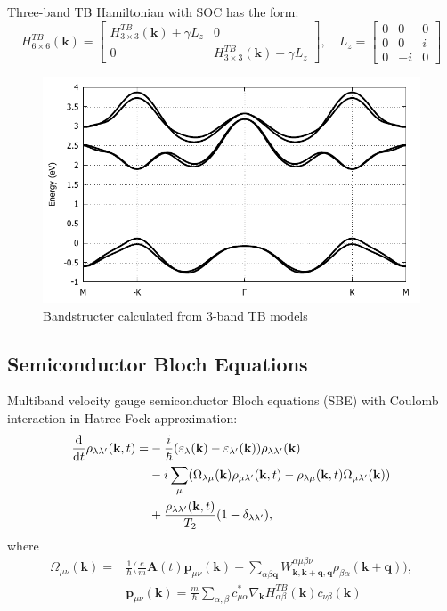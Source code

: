 \documentclass{beamer}
\begin{document}
	\begin{frame}
		Three-band TB Hamiltonian with SOC has the form:
		\begin{equation}
			H^{TB}_{6\times 6}(\textbf{k}) = \begin{bmatrix}
				H^{TB}_{3\times 3}(\textbf{k}) + \gamma L_z & 0\\ 0& H^{TB}_{3\times 3}(\textbf{k}) - \gamma L_z
			\end{bmatrix}, \quad L_z= \begin{bmatrix}
			0 & 0 & 0\\
			0 & 0 & i\\
			0 & -i& 0
			\end{bmatrix}
		\end{equation}
		\begin{figure}			
			\includegraphics[width=0.5\linewidth]{images/BS.pdf}
			\caption{Bandstructer calculated from 3-band TB models\cite{liu_three-band_2013}}
		\end{figure}
	\end{frame}
	\subsection{Semiconductor Bloch Equations}
	Multiband velocity gauge semiconductor Bloch equations (SBE) with Coulomb interaction in Hatree Fock approximation:
	\begin{align}
		\dv{ }{t}\rho_{\lambda \lambda'} (\textbf{k},t) = &-\frac{i}{\hbar} (\varepsilon_{\lambda}(\textbf{k}) -\varepsilon_{\lambda'}(\textbf{k}))\rho_{\lambda \lambda'} (\textbf{k})\nonumber\\
		& -i \sum_{\mu} (\Omega_{\lambda \mu}(\textbf{k})\rho_{\mu \lambda'}(\textbf{k},t) -\rho_{\lambda \mu}(\textbf{k},t)\Omega_{\mu \lambda'}(\textbf{k}))\\
		& + \frac{\rho_{\lambda \lambda'}(\textbf{k},t)}{T_2}(1-\delta_{\lambda\lambda'}),\nonumber
	\end{align}
	where
	\begin{align}
		\Omega_{\mu \nu}(\textbf{k}) = &\frac{1}{\hbar} \bigg(\frac{e}{m}\textbf{A}(t)\textbf{p}_{\mu \nu}(\textbf{k}) - \sum_{\alpha \beta \textbf{q}} W^{\alpha \mu \beta\nu}_{\textbf{k},\textbf{k}+\textbf{q},\textbf{q}}\rho_{\beta\alpha}(\textbf{k}+\textbf{q})\bigg),\\
		&\textbf{p}_{\mu\nu}(\textbf{k}) = \frac{m}{\hbar}\sum_{\alpha,\beta} c^*_{\mu\alpha}\nabla_{\textbf{k}}H^{TB}_{\alpha\beta}(\textbf{k})c_{\nu\beta}(\textbf{k})
	\end{align}
\end{document}
